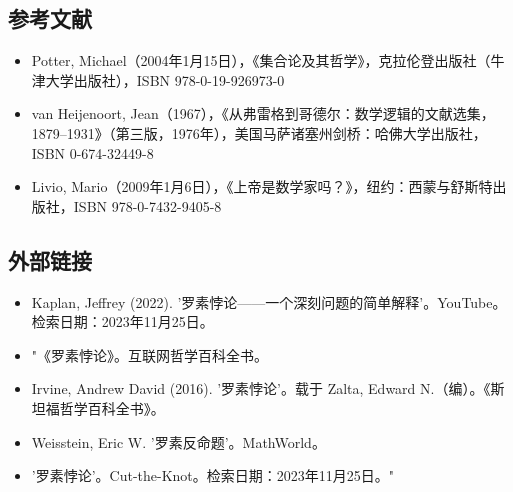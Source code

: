 \subsection{参考文献}  
\begin{itemize}
\item Potter, Michael（2004年1月15日），《集合论及其哲学》，克拉伦登出版社（牛津大学出版社），ISBN 978-0-19-926973-0  
\item van Heijenoort, Jean（1967），《从弗雷格到哥德尔：数学逻辑的文献选集，1879–1931》（第三版，1976年），美国马萨诸塞州剑桥：哈佛大学出版社，ISBN 0-674-32449-8  
\item Livio, Mario（2009年1月6日），《上帝是数学家吗？》，纽约：西蒙与舒斯特出版社，ISBN 978-0-7432-9405-8  
\end{itemize}
\subsection{外部链接}
\begin{itemize}
\item Kaplan, Jeffrey (2022). '罗素悖论——一个深刻问题的简单解释'。YouTube。检索日期：2023年11月25日。
\item "《罗素悖论》。互联网哲学百科全书。  
\item Irvine, Andrew David (2016). '罗素悖论'。载于 Zalta, Edward N.（编）。《斯坦福哲学百科全书》。  
\item Weisstein, Eric W. '罗素反命题'。MathWorld。  
\item '罗素悖论'。Cut-the-Knot。检索日期：2023年11月25日。"
\end{itemize}